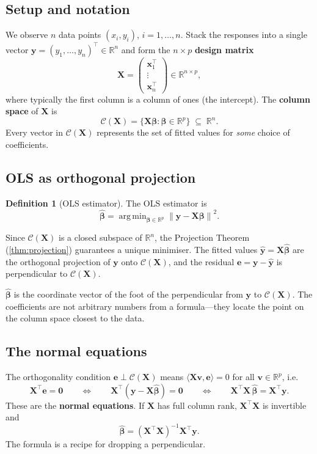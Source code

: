 \documentclass[11pt,a4paper]{article}
\theoremstyle{plain}
\theoremstyle{definition}
\newtheorem{definition}[theorem]{Definition}
\newcommand{\R}{\mathbb{R}}
\newcommand{\yhat}{\hat{\bm{y}}}
\newcommand{\bhat}{\hat{\bm{\beta}}}
\newcommand{\bX}{\bm{X}}
\newcommand{\by}{\bm{y}}
\newcommand{\be}{\bm{e}}
\newcommand{\Col}{\mathcal{C}}
\newcommand{\ip}[2]{\langle #1, #2 \rangle}
\newcommand{\norm}[1]{\left\lVert #1 \right\rVert}
\DeclareMathOperator*{\argmin}{arg\,min}
\begin{document}
\subsection{Setup and notation}

We observe $n$ data points $(x_i, y_i)$, $i=1,\dots,n$.
Stack the responses into a single vector
$\by = (y_1,\dots,y_n)^\top \in \R^n$ and form the
$n\times p$ \textbf{design matrix}
\[
  \bX = \begin{pmatrix} \bm{x}_1^\top \\ \vdots \\ \bm{x}_n^\top \end{pmatrix}
  \in \R^{n\times p},
\]
where typically the first column is a column of ones (the intercept).
The \textbf{column space} of $\bX$ is
\[
  \Col(\bX) = \bigl\{\bX\bm{\beta} : \bm{\beta}\in\R^p\bigr\}
  \;\subseteq\; \R^n.
\]
Every vector in $\Col(\bX)$ represents the set of fitted values for
\emph{some} choice of coefficients.

\subsection{OLS as orthogonal projection}

\begin{definition}[OLS estimator]
The OLS estimator is
\[
  \bhat = \argmin_{\bm{\beta}\in\R^p}
  \norm{\by - \bX\bm{\beta}}^2.
\]
\end{definition}

Since $\Col(\bX)$ is a closed subspace of $\R^n$, the Projection Theorem
(\ref{thm:projection}) guarantees a unique minimiser.
The fitted values $\yhat = \bX\bhat$ are the orthogonal projection of $\by$
onto $\Col(\bX)$, and the residual
$\be = \by - \yhat$
is perpendicular to $\Col(\bX)$.

\begin{keyinsight}
$\bhat$ is the coordinate vector of the foot of the perpendicular
from $\by$ to $\Col(\bX)$.
The coefficients are not arbitrary numbers from a formula---they locate
the point on the column space closest to the data.
\end{keyinsight}

\subsection{The normal equations}

The orthogonality condition $\be \perp \Col(\bX)$ means
$\ip{\bX\bm{v}}{\be} = 0$ for all $\bm{v}\in\R^p$, i.e.\
\[
  \bX^\top \be = \bm{0}
  \qquad\Longleftrightarrow\qquad
  \bX^\top(\by - \bX\bhat) = \bm{0}
  \qquad\Longleftrightarrow\qquad
  \boxed{\bX^\top\bX\,\bhat = \bX^\top\by.}
\]
These are the \textbf{normal equations}. If $\bX$ has full column rank,
$\bX^\top\bX$ is invertible and
\begin{equation}\label{eq:ols}
  \bhat = (\bX^\top\bX)^{-1}\bX^\top\by.
\end{equation}
The formula is a recipe for dropping a perpendicular.
\end{document}
